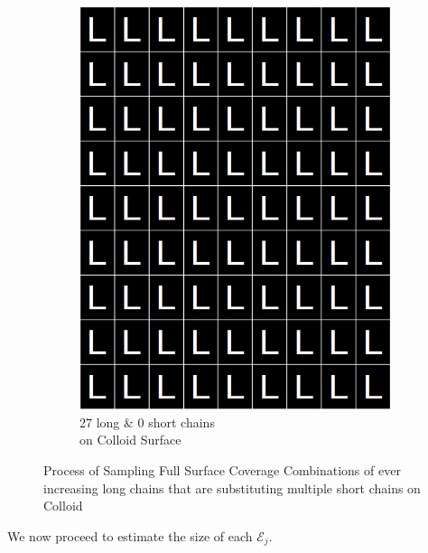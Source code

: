 \documentclass[journal=mamobx,manuscript=article]{achemso}
\begin{document}
\begin{figure}[H]
\begin{subfigure}[b]{0.4\textwidth}
        \includegraphics[scale=0.15]{fig8f.png}
        \caption{27 long \& 0 short chains\\ on Colloid Surface}
        \label{fig:F}
    \end{subfigure}
    \caption{Process of Sampling Full Surface Coverage Combinations of ever increasing long chains that are substituting multiple short chains  on Colloid}
    \label{figure 2}
\end{figure}



\noindent We now proceed to estimate the size of each $\mathcal{E}_j$.

\smallskip
\end{document}

